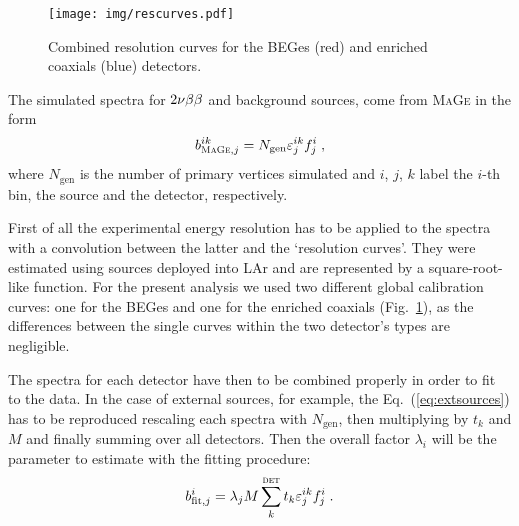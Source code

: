 \begin{figure}
	\centering
	\texttt{[image: img/rescurves.pdf]}
	\caption{Combined resolution curves for the BEGes (red) and enriched coaxials (blue) detectors.}\label{fig:rescurves}
\end{figure}
 The simulated spectra for $2\nbb$ and background sources, come from \textsc{MaGe} in the form
\begin{equation}b^{ik}_{\textsc{MaGe},j}=N_\text{gen}\epsilon^{ik}_jf_j^i\;,\end{equation}
where $N_\text{gen}$ is the number of primary vertices simulated and $i$, $j$, $k$ label the $i$-th bin, the source and the detector, respectively.

First of all the experimental energy resolution has to be applied to the spectra with a convolution between the latter and the `resolution curves'. They were estimated using  sources deployed into LAr and are represented by a square-root-like function. For the present analysis we used two different global calibration curves: one for the BEGes and one for the enriched coaxials (Fig.~\ref{fig:rescurves}), as the differences between the single curves within the two detector's types are negligible.

The spectra for each detector have then to be combined properly in order to fit to the data. In the case of external sources, for example, the Eq.~(\ref{eq:extsources}) has to be reproduced rescaling each spectra with $N_\text{gen}$, then multiplying by $t_k$ and $M$ and finally summing over all detectors. Then the overall factor $\lambda_i$ will be the parameter to estimate with the fitting procedure:
\begin{equation}b_{\text{fit},j}^i=\lambda_jM\sum_k^\textsc{det}t_k\epsilon_j^{ik}f_j^i\;.\end{equation}

